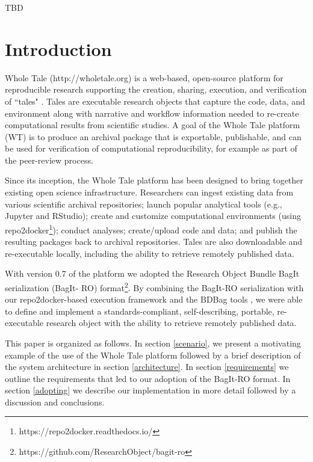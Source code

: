 \documentclass[conference]{IEEEtran}
\begin{document}
\begin{IEEEkeywords}
TBD
\end{IEEEkeywords}

\section{Introduction}

Whole Tale (http://wholetale.org) is a web-based, open-source platform for reproducible research 
supporting the creation, sharing, execution, and verification of ``tales" \cite{brinckman2019, chard2019}. Tales are executable  research objects that capture the code, data, and environment along with narrative and workflow information needed to re-create computational results from scientific studies. A goal of the Whole Tale platform (WT) is to produce an archival package that is exportable, publishable, and can be used for verification of computational reproducibility, for example as part of the peer-review  process.

Since its inception, the Whole Tale platform has been designed to bring together existing open 
science infrastructure.  Researchers can ingest existing data from various scientific archival 
repositories; launch popular analytical tools (e.g., Jupyter and RStudio); create and customize 
computational environments (using repo2docker\footnote{https://repo2docker.readthedocs.io/}); 
conduct analyses; create/upload code and data; and  publish the resulting packages back to 
archival repositories. Tales are also downloadable and re-executable locally, including the 
ability to retrieve remotely published data.  

With version 0.7 of the platform we adopted the Research Object Bundle BagIt serialization (BagIt-
RO) format\footnote{https://github.com/ResearchObject/bagit-ro}. By combining the BagIt-RO 
serialization with our repo2docker-based execution framework  and the BDBag tools 
\cite{chard2016}, we were able to  define and implement a standards-compliant, self-describing, 
portable, re-executable research object with the ability to retrieve remotely published data.

This paper is organized as follows.  In section \ref{scenario}, we present a motivating example of the use of the Whole Tale platform followed by a brief description of the system architecture in section \ref{architecture}. In section \ref{requirements} we outline the requirements that led to our adoption of the BagIt-RO format. In section \ref{adopting} we describe our implementation in more detail followed by a discussion and conclusions.
\end{document}
